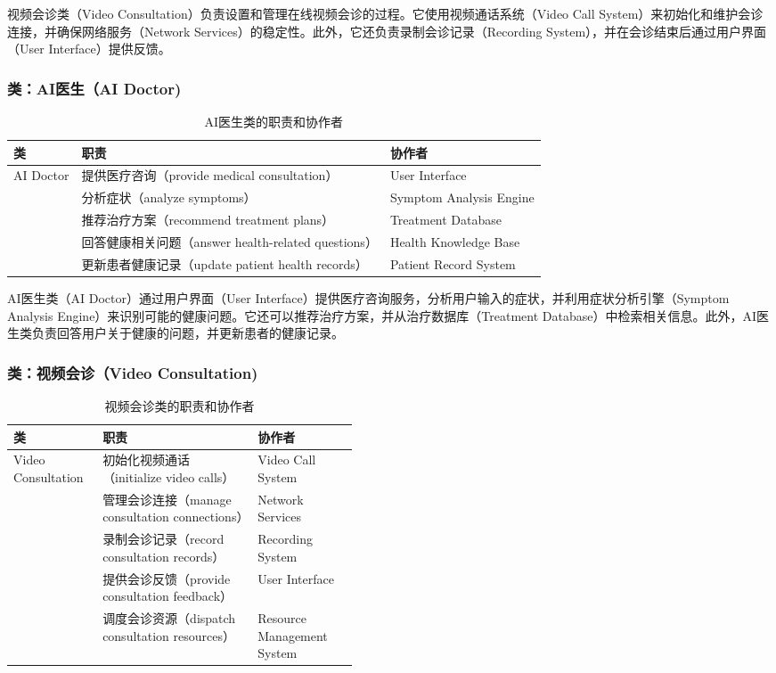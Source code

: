 视频会诊类（Video Consultation）负责设置和管理在线视频会诊的过程。它使用视频通话系统（Video Call System）来初始化和维护会诊连接，并确保网络服务（Network Services）的稳定性。此外，它还负责录制会诊记录（Recording System），并在会诊结束后通过用户界面（User Interface）提供反馈。

\subsubsection{类：AI医生（AI Doctor)}
\begin{table}[htbp]
	\centering
	\begin{tabular}{|l|l|l|}
		\hline
		\textbf{类} & \textbf{职责} & \textbf{协作者} \\
		\hline
		AI Doctor & 提供医疗咨询（provide medical consultation） & User Interface \\
		& 分析症状（analyze symptoms） & Symptom Analysis Engine \\
		& 推荐治疗方案（recommend treatment plans） & Treatment Database \\
		& 回答健康相关问题（answer health-related questions） & Health Knowledge Base \\
		& 更新患者健康记录（update patient health records） & Patient Record System \\
		\hline
	\end{tabular}
	\caption{AI医生类的职责和协作者}
	\label{tab:ai_doctor}
\end{table}

AI医生类（AI Doctor）通过用户界面（User Interface）提供医疗咨询服务，分析用户输入的症状，并利用症状分析引擎（Symptom Analysis Engine）来识别可能的健康问题。它还可以推荐治疗方案，并从治疗数据库（Treatment Database）中检索相关信息。此外，AI医生类负责回答用户关于健康的问题，并更新患者的健康记录。

\subsubsection{类：视频会诊（Video Consultation)}
\begin{table}[htbp]
	\centering
	\begin{tabular}{|l|p{0.45\linewidth}|l|}
		\hline
		\textbf{类} & \textbf{职责} & \textbf{协作者} \\
		\hline
		Video Consultation & 初始化视频通话（initialize video calls） & Video Call System \\
		& 管理会诊连接（manage consultation connections） & Network Services \\
		& 录制会诊记录（record consultation records） & Recording System \\
		& 提供会诊反馈（provide consultation feedback） & User Interface \\
		& 调度会诊资源（dispatch consultation resources） & Resource Management System \\
		\hline
	\end{tabular}
	\caption{视频会诊类的职责和协作者}
	\label{tab:video_consultation}
\end{table}

